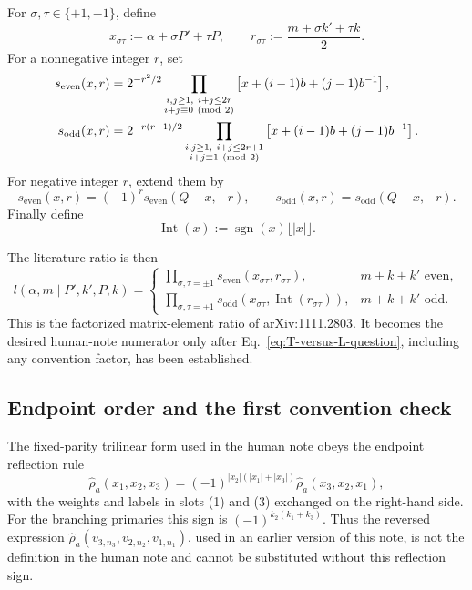 \documentclass[11pt]{article}
\newcommand{\se}{s_{\mathrm{even}}}
\newcommand{\so}{s_{\mathrm{odd}}}
\newcommand{\hatrho}{\widehat\rho}
\begin{document}
For \(\sigma,\tau\in\{+1,-1\}\), define
\begin{equation}
 x_{\sigma\tau}:=\alpha+\sigma P'+\tau P,
 \qquad
 r_{\sigma\tau}:=\frac{m+\sigma k'+\tau k}{2}.
 \label{eq:x-r}
\end{equation}
For a nonnegative integer \(r\), set
\begin{align}
 \se(x,r)
 &=2^{-r^2/2}
 \prod_{\substack{i,j\ge1,\ i+j\le2r\\i+j\equiv0\ ({\rm mod}\ 2)}}
 \left[x+(i-1)b+(j-1)b^{-1}\right],
 \notag\\
 \so(x,r)
 &=2^{-r(r+1)/2}
 \prod_{\substack{i,j\ge1,\ i+j\le2r+1\\i+j\equiv1\ ({\rm mod}\ 2)}}
 \left[x+(i-1)b+(j-1)b^{-1}\right].
 \label{eq:s-positive}
\end{align}
For negative integer \(r\), extend them by
\begin{equation}
 \se(x,r)=(-1)^r\se(Q-x,-r),
 \qquad
 \so(x,r)=\so(Q-x,-r).
 \label{eq:s-negative}
\end{equation}
Finally define
\begin{equation}
 \operatorname{Int}(x):=\operatorname{sgn}(x)\lfloor|x|\rfloor.
 \label{eq:Int}
\end{equation}

The literature ratio is then
\begin{equation}
 \boxed{
 l(\alpha,m\mid P',k',P,k)
 =\begin{cases}
 \displaystyle
 \prod_{\sigma,\tau=\pm1}
 \se\left(x_{\sigma\tau},r_{\sigma\tau}\right),
 &m+k+k'\text{ even},\\[1.2em]
 \displaystyle
 \prod_{\sigma,\tau=\pm1}
 \so\left(x_{\sigma\tau},
 \operatorname{Int}(r_{\sigma\tau})\right),
 &m+k+k'\text{ odd}.
 \end{cases}}
 \label{eq:l-product}
\end{equation}
This is the factorized matrix-element ratio of arXiv:1111.2803.  It becomes
the desired human-note numerator only after
Eq.~\eqref{eq:T-versus-L-question}, including any convention factor, has
been established.

\subsection{Endpoint order and the first convention check}

The fixed-parity trilinear form used in the human note obeys the endpoint
reflection rule
\begin{equation}
 \hatrho_a(x_1,x_2,x_3)
 =(-1)^{|x_2|(|x_1|+|x_3|)}
 \hatrho_a(x_3,x_2,x_1),
 \label{eq:human-reflection}
\end{equation}
with the weights and labels in slots (1) and (3) exchanged on the
right-hand side.  For the branching primaries this sign is
\((-1)^{k_2(k_1+k_3)}\).  Thus the reversed expression
\(\hatrho_a(v_{3,n_3},v_{2,n_2},v_{1,n_1})\), used in an earlier version of
this note, is not the definition in the human note and cannot be substituted
without this reflection sign.
\end{document}
